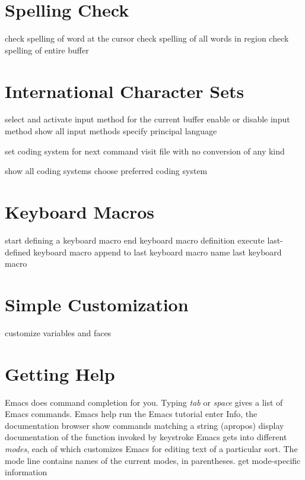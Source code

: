 \section{Spelling Check}

 check spelling of word at the cursor
 check spelling of all words in region
 check spelling of entire buffer

\section{International Character Sets}

 select and activate input method for
  the current buffer
 enable or disable input method
 show all input methods
 specify principal language

 set coding system for next command
 visit file with no conversion
  of any kind

 show all coding systems
 choose preferred coding system

\section{Keyboard Macros}

 start defining a keyboard macro
 end keyboard macro definition
 execute last-defined keyboard macro
 append to last keyboard macro
 name last keyboard macro

\section{Simple Customization}

 customize variables and faces

\section{Getting Help}

Emacs does command completion for you.  Typing 
{\it tab\/} or {\it space\/} gives a list of Emacs commands.
\askip
{} Emacs help
 run the Emacs tutorial
 enter Info, the documentation browser
 show commands matching a string (apropos)
 display documentation of the function invoked by
  keystroke
\askip
Emacs gets into different {\it modes}, each of which customizes
Emacs for editing text of a particular sort.  The mode line
contains names of the current modes, in parentheses.
\askip
{} get mode-specific information

\copyrightnotice

\bye

